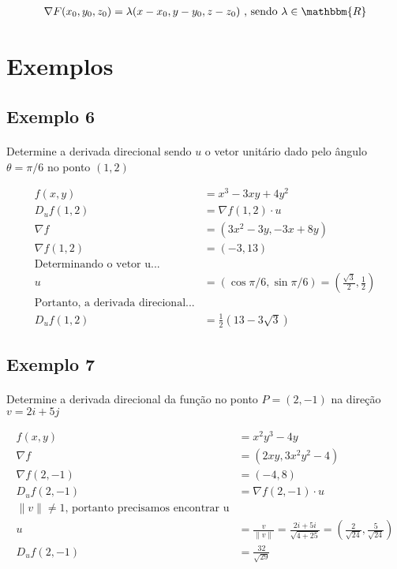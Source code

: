 \documentclass{article}
\newcommand{\norm}[1] {\left.\parallel #1 \right.\parallel}
\begin{document}
                \begin{align*}
                    \nabla F (x_0, y_0, z_0) &= \lambda (x - x_0, y - y_0, z - z_0) \text{ , sendo }\lambda \in \mathbbm{R}\\
                \end{align*}

    \section{Exemplos}
        \subsection{Exemplo 6}
            \paragraph{}
            Determine a derivada direcional sendo $u$ o vetor unitário dado pelo ângulo $\theta = \pi/6$ no ponto $(1, 2)$

            \begin{align*}
                f(x, y) &= x^3 - 3xy + 4y^2\\
                D_u f(1, 2) &= \nabla f(1, 2) \cdot u\\
                \nabla f &= (3x^2 - 3y, -3x + 8y)\\
                \nabla f(1, 2) &= (-3, 13)\\
                \text{Determinando o vetor u...}\\
                u &= (\cos{\pi/6}, \sin{\pi/6}) = (\frac{\sqrt{3}}{2}, \frac{1}{2})\\
                \text{Portanto, a derivada direcional...}\\
                D_u f(1, 2) &= \frac{1}{2} (13 - 3\sqrt{3})
            \end{align*}

        \subsection{Exemplo 7}
            \paragraph{}
            Determine a derivada direcional da função no ponto $P = (2, -1)$ na direção $v = 2i + 5j$

            \begin{align*}
                f(x, y) &= x^2y^3 - 4y\\
                \nabla f &= (2xy, 3x^2y^2 - 4)\\
                \nabla f(2, -1) &= (-4, 8)\\
                D_u f(2, -1) &= \nabla f(2, -1) \cdot u\\
                \text{$\norm{v} \neq 1$, portanto precisamos encontrar u}\\
                u &= \frac{v}{\norm{v}} = \frac{2i + 5i} {\sqrt{4 + 25}} = \left(\frac{2}{\sqrt{24}}, \frac{5}{\sqrt{24}}\right)\\
                D_u f(2, -1) &= \frac{32}{\sqrt{29}}
            \end{align*}
\end{document}
